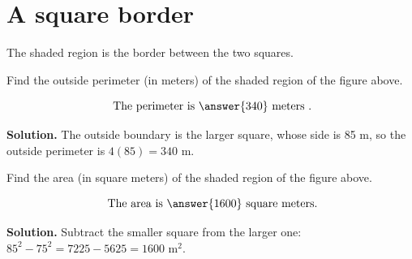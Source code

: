 \documentclass{ximera}
\begin{document}
\section*{A square border}

The shaded region is the border between the two squares.


\begin{problem}
Find the outside perimeter (in meters) of the shaded region of the figure above.

\[
\text{ The perimeter is } \answer{340} \text{ meters }.
\]

\begin{hint}
\textbf{Solution.} The outside boundary is the larger square, whose side is 85 m, so the
outside perimeter is $4(85) = 340$ m.
\end{hint}
\end{problem}

\begin{problem}
   Find the area (in square meters) of the shaded region of the figure above.

   \[
   \text{ The area is } \answer{1600} \text{ square meters}.
   \]

\begin{hint}
\textbf{Solution.} Subtract the smaller square from the larger one:
$85^2 - 75^2 = 7225 - 5625 = 1600$ m$^2$.
\end{hint}
\end{problem}
\end{document}
